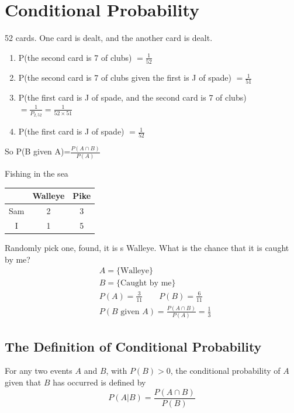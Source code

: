 \section{Conditional Probability}
\begin{exmp}
52 cards. One card is dealt, and the another card is dealt.
\begin{enumerate}
\item P(the second card is 7 of clubs)
$=\frac{1}{52}$
\item P(the second card is 7 of clubs given the first is J of spade)
$=\frac{1}{51}$
\item P(the first card is J of spade, and the second card is 7 of clubs)
$=\frac{1}{P_{2,52}}=\frac{1}{52\times 51}$
\item P(the first card is J of spade)
$=\frac{1}{52}$
\end{enumerate}

So P(B given A)=$\frac{P(A \cap B)}{P(A)}$
\end{exmp}

\begin{exmp}
Fishing in the sea
\begin{center}
\begin{tabular}{c|cc}
\hline
 & Walleye & Pike\\
 \hline
 Sam & 2 &3\\
 \hline
 I & 1 &5\\
 \hline
\end{tabular}
\end{center}
Randomly pick one, found, it is s Walleye. What is the chance that it is caught by me?
\begin{align*}
&A=\{\text{Walleye}\}\\
&B=\{\text{Caught by me}\}\\
&P(A)=\frac{3}{11} \qquad P(B)=\frac{6}{11}\\
&P(B\text{ given }A)=\frac{P(A \cap B)}{P(A)}=\boxed{\frac{1}{3}}
\end{align*}
\end{exmp}

\subsection{The Definition of Conditional Probability}
\begin{defn}
For any two events $A$ and $B$, with $P(B)>0$, the conditional probability of $A$ given that $B$ has occurred is defined by
\[P(A|B)=\frac{P(A \cap B)}{P(B)}\]
\end{defn} 

